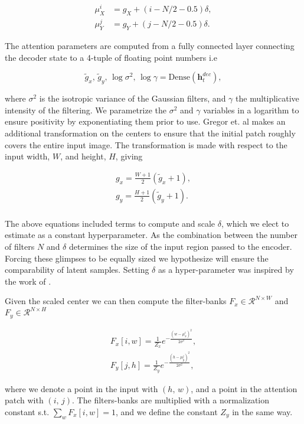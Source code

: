 \begin{align}
 \mu_X^i &= g_X + (i - N/2-0.5)\delta, \\
 \mu_Y^j &= g_Y + (j - N/2-0.5)\delta.
 \end{align}

\noindent The attention parameters are computed from a fully connected layer connecting the decoder state to a 4-tuple of floating point numbers i.e

\begin{equation}\label{eq:draw_params}
\tilde{g}_x, \,\tilde{g}_y, \, \log \sigma^2, \, \log \gamma = \text{Dense} (\mathbf{h}_t^{dec}),
\end{equation}

\noindent where $\sigma^2$ is the isotropic variance of the Gaussian filters, and $\gamma$ the multiplicative intensity of the filtering. We parametrize the $\sigma^2$ and $\gamma$ variables in a logarithm to ensure positivity by exponentiating them prior to use. Gregor et. al makes an additional transformation on the centers to ensure that the initial patch roughly covers the entire input image. The transformation is made with respect to the input width, $W$, and height, $H$, giving

\begin{align}
g_x = \frac{W +1 }{2} (\tilde{g}_x +1 ), \\
g_y = \frac{H +1 }{2} (\tilde{g}_y +1 ). \\
\end{align}

\noindent The above equations included terms to compute and scale $\delta$, which we elect to estimate as a constant hyperparameter. As the combination between the number of filters $N$ and $\delta$ determines the size of the input region passed to the encoder. Forcing these glimpses to be equally sized we hypothesize will ensure the comparability of latent samples. Setting $\delta$ as a hyper-parameter was inspired by the work of \citet{Harris2019}.

Given the scaled center we can then compute the filter-banks $F_x \in \mathcal{R}^{N \times W}$ and $F_y \in \mathcal{R}^{N \times H}$

\begin{align}
F_x [i, w] = \frac{1}{Z_x}e^{-\frac{(w - \mu_x^i)^2}{2\sigma^2}},\label{eq:Fx} \\
F_y [j, h] = \frac{1}{Z_y}e^{-\frac{(h - \mu_y^j)^2}{2\sigma^2}},\label{eq:Fy}
\end{align}

\noindent where we denote a point in the input with $(h,\, w)$, and a point in the attention patch with $(i,\, j)$. The filters-banks are multiplied with a normalization constant s.t. $\sum_w F_x[i, w] = 1$, and we define the constant $Z_y$ in the same way. 

